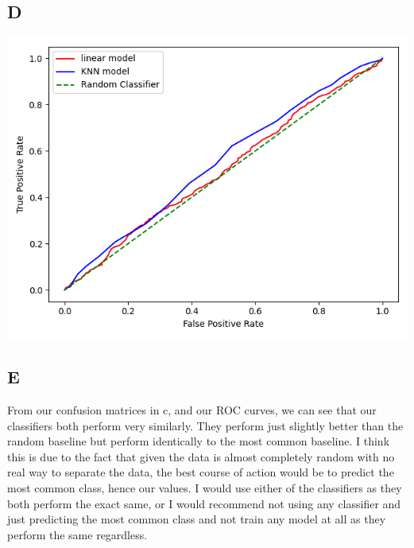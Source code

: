 \documentclass[11pt]{article} %
\begin{document}
\subsection{D}
\begin{center}
\includegraphics[scale=0.5]{roc1.png}
\end{center}
\subsection{E}
From our confusion matrices in c, and our ROC curves, we can see that our classifiers both perform very similarly. They perform just slightly better than the random baseline but perform identically to the most common baseline. I think this is due to the fact that given the data is almost completely random with no real way to separate the data, the best course of action would be to predict the most common class, hence our values. I would use either of the classifiers as they both perform the exact same, or I would recommend not using any classifier and just predicting the most common class and not train any model at all as they perform the same regardless.
\end{document}
